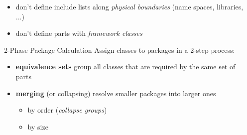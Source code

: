 \documentclass[final]{beamer}
\newlength{\sepwid}
\newlength{\onecolwid}
\newlength{\twocolwid}
\begin{document}
\begin{frame}[t]
\begin{columns}[t]


    \begin{column}{\sepwid}\end{column}			%

    \begin{column}{\twocolwid}  %
    \begin{columns}[t,totalwidth=\twocolwid] %
    \begin{column}{\onecolwid}
      \begin{block}{}
        \begin{itemize}
          \item don't define include lists along \textit{physical boundaries} (name
            spaces, libraries, ...)
          \item don't define parts with \textit{framework classes}
        \end{itemize}
      \end{block}

      \begin{block}{2-Phase Package Calculation}
        Assign classes to packages in a 2-step process:
        \begin{itemize}
          \item \textbf{equivalence sets} group all classes that are required by the
            same set of parts
          \item \textbf{merging} (or collapsing) resolve smaller packages into
            larger ones
            \begin{itemize}
              \item by order (\textit{collapse groups})
              \item by size
            \end{itemize}
        \end{itemize}
      \end{block}
    \end{column}


\end{columns}
\end{column}
\end{columns}
\end{frame}
\end{document}
